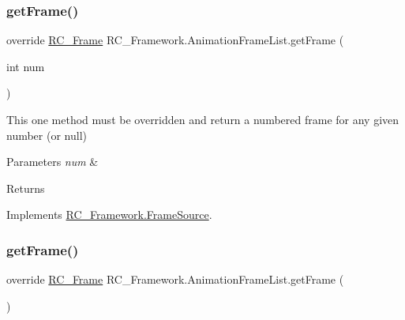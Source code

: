 \subsubsection{\texorpdfstring{get\+Frame()}{getFrame()}\hspace{0.1cm}{\footnotesize\ttfamily [1/2]}}
{\footnotesize\ttfamily override \mbox{\hyperlink{class_r_c___framework_1_1_r_c___frame}{R\+C\+\_\+\+Frame}} R\+C\+\_\+\+Framework.\+Animation\+Frame\+List.\+get\+Frame (\begin{DoxyParamCaption}\item[{int}]{num }\end{DoxyParamCaption})\hspace{0.3cm}{\ttfamily [virtual]}}



This one method must be overridden and return a numbered frame for any given number (or null) 


\begin{DoxyParams}{Parameters}
{\em num} & \\
\hline
\end{DoxyParams}
\begin{DoxyReturn}{Returns}

\end{DoxyReturn}


Implements \mbox{\hyperlink{class_r_c___framework_1_1_frame_source_a562dc295b5c265ec760227978802eb3a}{R\+C\+\_\+\+Framework.\+Frame\+Source}}.

\mbox{\label{class_r_c___framework_1_1_animation_frame_list_a5bc162ddb15e2ef4f98b72be2720a87b}} 
\subsubsection{\texorpdfstring{get\+Frame()}{getFrame()}\hspace{0.1cm}{\footnotesize\ttfamily [2/2]}}
{\footnotesize\ttfamily override \mbox{\hyperlink{class_r_c___framework_1_1_r_c___frame}{R\+C\+\_\+\+Frame}} R\+C\+\_\+\+Framework.\+Animation\+Frame\+List.\+get\+Frame (\begin{DoxyParamCaption}{ }\end{DoxyParamCaption})\hspace{0.3cm}{\ttfamily [virtual]}}



